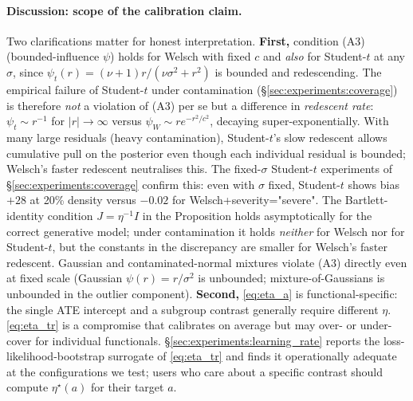 \paragraph{Discussion: scope of the calibration claim.}
Two clarifications matter for honest interpretation. \textbf{First,}
condition (A3) (bounded-influence $\psi$) holds for Welsch with
fixed $c$ and \emph{also} for Student-$t$ at any $\sigma$, since
$\psi_t(r) = (\nu+1)r/(\nu\sigma^2 + r^2)$ is bounded and
redescending. The empirical failure of Student-$t$ under
contamination (\S\ref{sec:experiments:coverage}) is therefore
\emph{not} a violation of (A3) per se but a difference in
\emph{redescent rate}: $\psi_t \sim r^{-1}$ for $|r| \to \infty$
versus $\psi_W \sim r e^{-r^2/c^2}$, decaying super-exponentially.
With many large residuals (heavy contamination), Student-$t$'s
slow redescent allows cumulative pull on the posterior even though
each individual residual is bounded; Welsch's faster redescent
neutralises this. The fixed-$\sigma$ Student-$t$ experiments of
\S\ref{sec:experiments:coverage} confirm this: even with
$\sigma$ fixed, Student-$t$ shows bias $+28$ at 20\% density
versus $-0.02$ for Welsch+severity="severe". The Bartlett-identity
condition $J = \eta^{-1} I$ in the Proposition holds asymptotically
for the correct generative model; under contamination it holds
\emph{neither} for Welsch nor for Student-$t$, but the constants
in the discrepancy are smaller for Welsch's faster redescent.
Gaussian and contaminated-normal mixtures violate (A3) directly
even at fixed scale (Gaussian $\psi(r) = r/\sigma^2$ is unbounded;
mixture-of-Gaussians is unbounded in the outlier component).
\textbf{Second,} \eqref{eq:eta_a} is functional-specific: the
single ATE intercept and a subgroup contrast generally require
different $\eta$. \eqref{eq:eta_tr} is a compromise that calibrates
on average but may over- or under-cover for individual functionals.
\S\ref{sec:experiments:learning_rate} reports the
loss-likelihood-bootstrap surrogate of \eqref{eq:eta_tr} and finds
it operationally adequate at the configurations we test; users
who care about a specific contrast should compute $\eta^\star(a)$
for their target $a$.

